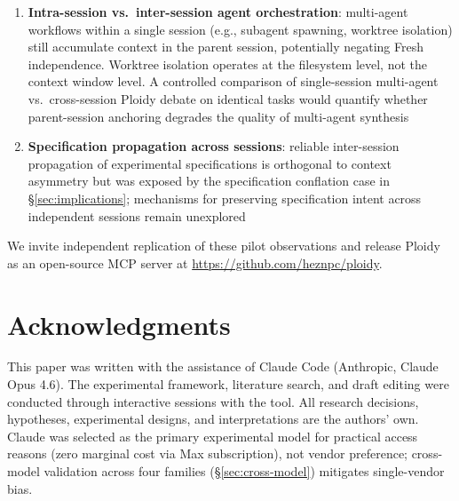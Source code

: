 \documentclass[11pt]{article}
\begin{document}
\begin{enumerate}[label=\arabic*., leftmargin=1.5em]
  \item \textbf{Intra-session vs.\ inter-session agent orchestration}: multi-agent workflows within a single session (e.g., subagent spawning, worktree isolation) still accumulate context in the parent session, potentially negating Fresh independence. Worktree isolation operates at the filesystem level, not the context window level. A controlled comparison of single-session multi-agent vs.\ cross-session Ploidy debate on identical tasks would quantify whether parent-session anchoring degrades the quality of multi-agent synthesis
  \item \textbf{Specification propagation across sessions}: reliable inter-session propagation of experimental specifications is orthogonal to context asymmetry but was exposed by the specification conflation case in \S\ref{sec:implications}; mechanisms for preserving specification intent across independent sessions remain unexplored
\end{enumerate}

We invite independent replication of these pilot observations and release Ploidy as an open-source MCP server at \url{https://github.com/heznpc/ploidy}.

\section*{Acknowledgments}

This paper was written with the assistance of Claude Code (Anthropic, Claude Opus 4.6). The experimental framework, literature search, and draft editing were conducted through interactive sessions with the tool. All research decisions, hypotheses, experimental designs, and interpretations are the authors' own. Claude was selected as the primary experimental model for practical access reasons (zero marginal cost via Max subscription), not vendor preference; cross-model validation across four families (\S\ref{sec:cross-model}) mitigates single-vendor bias.


\end{document}
